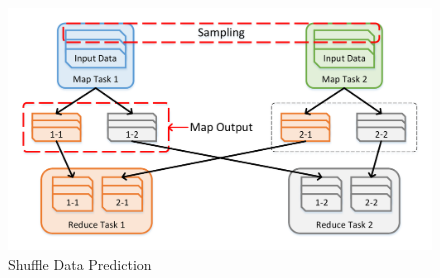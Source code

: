 \documentclass[10pt,twocolumn]{article}
\begin{document}
\begin{figure}
	\centering
	\includegraphics[width=\linewidth]{fig/shuffle}
	\caption{Shuffle Data Prediction}
	\label{fig:shuffle}
\end{figure}
\end{document}
